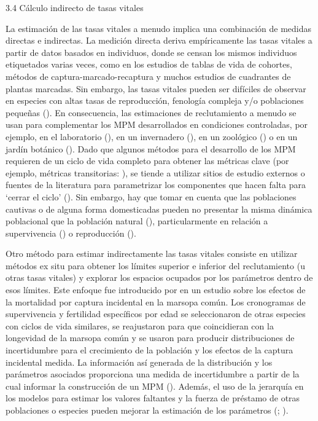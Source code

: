 \documentclass[
]{book}
\theoremstyle{definition}
\theoremstyle{definition}
\theoremstyle{definition}
\theoremstyle{definition}
\theoremstyle{remark}
\begin{document}
3.4 \textbar{} Cálculo indirecto de tasas vitales

La estimación de las tasas vitales a menudo implica una combinación de medidas directas e indirectas. La medición directa deriva empíricamente las tasas vitales a partir de datos basados en individuos, donde se censan los mismos individuos etiquetados varias veces, como en los estudios de tablas de vida de cohortes, métodos de captura-marcado-recaptura y muchos estudios de cuadrantes de plantas marcadas. Sin embargo, las tasas vitales pueden ser difíciles de observar en especies con altas tasas de reproducción, fenología compleja y/o poblaciones pequeñas (\citet{beissinger1998use}). En consecuencia, las estimaciones de reclutamiento a menudo se usan para complementar los MPM desarrollados en condiciones controladas, por ejemplo, en el laboratorio (\citet{jouvet2018demographic}), en un invernadero (\citet{gontijo2020using}), en un zoológico (\citet{clubb2009fecundity}) o en un jardín botánico (\citet{jimenez2010population}). Dado que algunos métodos para el desarrollo de los MPM requieren de un ciclo de vida completo para obtener las métricas clave (por ejemplo, métricas transitorias: \citet{stott2011framework}), se tiende a utilizar sitios de estudio externos o fuentes de la literatura para parametrizar los componentes que hacen falta para `cerrar el ciclo' (\citet{omeyer2021investigating}). Sin embargo, hay que tomar en cuenta que las poblaciones cautivas o de alguna forma domesticadas pueden no presentar la misma dinámica poblacional que la población natural (\citet{clubb2003captivity}), particularmente en relación a supervivencia (\citet{che2021comparative}) o reproducción (\citet{clubb2009fecundity}).

Otro método para estimar indirectamente las tasas vitales consiste en utilizar métodos ex situ para obtener los límites superior e inferior del reclutamiento (u otras tasas vitales) y explorar los espacios ocupados por los parámetros dentro de esos límites. Este enfoque fue introducido por \citet{caswell1998harbor} en un estudio sobre los efectos de la mortalidad por captura incidental en la marsopa común. Los cronogramas de supervivencia y fertilidad específicos por edad se seleccionaron de otras especies con ciclos de vida similares, se reajustaron para que coincidieran con la longevidad de la marsopa común y se usaron para producir distribuciones de incertidumbre para el crecimiento de la población y los efectos de la captura incidental medida. La información así generada de la distribución y los parámetros asociados proporciona una medida de incertidumbre a partir de la cual informar la construcción de un MPM (\citet{tenhumberg2008monte}). Además, el uso de la jerarquía en los modelos para estimar los valores faltantes y la fuerza de préstamo de otras poblaciones o especies pueden mejorar la estimación de los parámetros (\citet{james2021bridging}; \citet{tremblay2014bayesian}).
\end{document}
